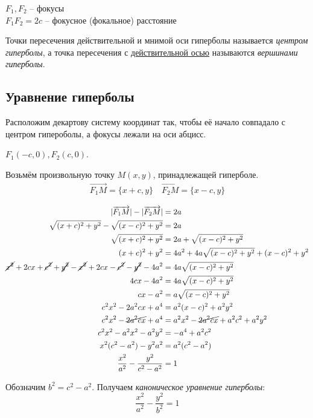 $F_1, F_2$ -- фокусы \\
$F_1F_2 = 2c$ -- фокусное (фокальное) расстояние

Точки пересечения действительной и мнимой оси гиперболы называется \textit{центром гиперболы}, а точка пересечения с \underline{действительной осью} называются \textit{вершинами гиперболы}.

\subsection*{Уравнение гиперболы}

Расположим декартову систему координат так, чтобы её начало совпадало с центром гипероболы, а фокусы лежали на оси абцисс.

$F_1(-c, 0), F_2(c, 0)$.

Возьмём произвольную точку $M(x, y)$, принадлежащей гиперболе.
\begin{gather*}
  \overrightarrow{F_1M} = \{x + c, y\} \quad
  \overrightarrow{F_2M} = \{x - c, y\} \\
\end{gather*}
\begin{align*}
  |\overrightarrow{F_1M}| - |\overrightarrow{F_2M}| &= 2a \\
  \sqrt{(x + c)^2 + y^2} - \sqrt{(x - c)^2 + y^2} &= 2a \\
  \sqrt{(x + c)^2 + y^2} &= 2a + \sqrt{(x - c)^2 + y^2} \\
  (x + c)^2 + y^2 &= 4a^2 + 4a\sqrt{(x - c)^2 + y^2} + (x - c)^2 +y^2 \\
  \cancel{x^2} + 2cx + \cancel{c^2} + \cancel{y^2} - \cancel{x^2} + 2cx - \cancel{c^2} - \cancel{y^2} - 4a^2 &= 4a\sqrt{(x - c)^2 + y^2} \\
  4cx - 4a^2 &= 4a\sqrt{(x - c)^2 + y^2} \\
  cx - a^2 &= a\sqrt{(x - c)^2 + y^2} \\
  c^2x^2 - 2a^2cx + a^4 &= a^2(x - c)^2 + a^2y^2 \\
  c^2x^2 - \cancel{2a^2cx} + a^4 &= a^2x^2 - \cancel{2a^2cx} + a^2c^2 + a^2y^2 \\
  c^2x^2 - a^2x^2 - a^2y^2 &= - a^4 + a^2c^2 \\
  x^2(c^2 - a^2) - y^2a^2 &= a^2(c^2 - a^2) \\
  \frac{x^2}{a^2} - \frac{y^2}{c^2 - a^2} &= 1
\end{align*}

Обозначим $b^2 = c^2 - a^2$. Получаем \textit{каноническое уравнение гиперболы}: \[
  \boxed{\frac{x^2}{a^2} - \frac{y^2}{b^2} = 1}
\]  

